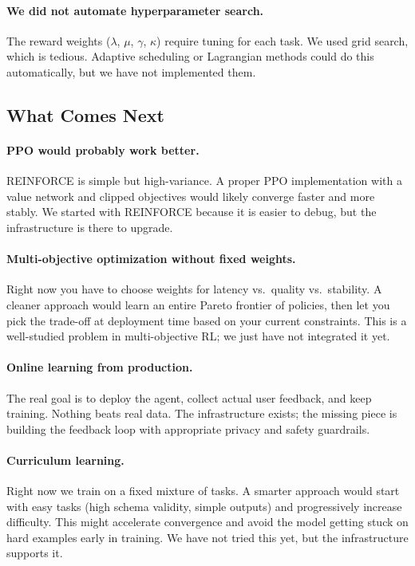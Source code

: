\documentclass[11pt]{article}
\begin{document}
\paragraph{We did not automate hyperparameter search.}
The reward weights ($\lambda$, $\mu$, $\gamma$, $\kappa$) require tuning for each task.
We used grid search, which is tedious.
Adaptive scheduling or Lagrangian methods could do this automatically, but we have not implemented them.

\subsection{What Comes Next}

\paragraph{PPO would probably work better.}
REINFORCE is simple but high-variance.
A proper PPO implementation with a value network and clipped objectives would likely converge faster and more stably.
We started with REINFORCE because it is easier to debug, but the infrastructure is there to upgrade.

\paragraph{Multi-objective optimization without fixed weights.}
Right now you have to choose weights for latency vs.\ quality vs.\ stability.
A cleaner approach would learn an entire Pareto frontier of policies, then let you pick the trade-off at deployment time based on your current constraints.
This is a well-studied problem in multi-objective RL; we just have not integrated it yet.

\paragraph{Online learning from production.}
The real goal is to deploy the agent, collect actual user feedback, and keep training.
Nothing beats real data.
The infrastructure exists; the missing piece is building the feedback loop with appropriate privacy and safety guardrails.

\paragraph{Curriculum learning.}
Right now we train on a fixed mixture of tasks.
A smarter approach would start with easy tasks (high schema validity, simple outputs) and progressively increase difficulty.
This might accelerate convergence and avoid the model getting stuck on hard examples early in training.
We have not tried this yet, but the infrastructure supports it.
\end{document}
